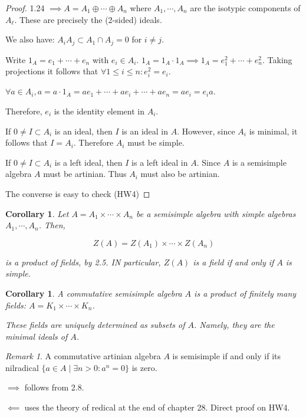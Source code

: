\documentclass{article}
\theoremstyle{definition}
\theoremstyle{plain}
\newtheorem{corollary}[theorem]{Corollary}
\theoremstyle{remark}
\newtheorem{remark}[theorem]{Remark}
\begin{document}
    \begin{proof}
        1.24 \(\implies A = A_1 \oplus \cdots \oplus A_n\) where \(A_1, \cdots , A_n\) are the isotypic components of \(A_\ell\). These are precisely the (2-sided) ideals.

        We also have: \(A_i A_j \subset A_1 \cap A_j = 0\) for \(i\neq j\).

        Write \(1_A = e_1 + \cdots + e_n\) with \(e_i \in A_i\). \(1_A = 1_A \cdot 1_A \implies 1_A = e_1^2 + \cdots + e_n^2\). Taking projections it follows that \(\forall 1 \leq i \leq n: e_i^2 = e_i\).
        
        \(\forall a\in A_i, a = a\cdot 1_A = ae_1 + \cdots + ae_i + \cdots + ae_n = ae_i = e_i a\).
        
        Therefore, \(e_i\) is the identity element in \(A_i\).

        If \(0\neq I \subset A_i\) is an ideal, then \(I\) is an ideal in \(A\). However, since \(A_i\) is minimal, it follows that \(I = A_i\). Therefore \(A_i\) must be simple.

        If \(0 \neq I \subset A_i\) is a left ideal, then \(I\) is a left ideal in \(A\). Since \(A\) is a semisimple algebra \(A\) must be artinian. Thus \(A_i\) must also be artinian.

        The converse is easy to check (HW4)
    \end{proof}

    \begin{corollary}
        Let \(A = A_1 \times \cdots \times A_n\) be a semisimple algebra with simple algebras \(A_1, \cdots , A_n\). Then,
        
        \[
            Z(A) = Z(A_1) \times \cdots \times Z(A_n)
        \]

        is a product of fields, by 2.5. IN particular, \(Z(A)\) is a field if and only if \(A\) is simple.
    \end{corollary}

    \begin{corollary}
        A commutative semisimple algebra \(A\) is a product of finitely many fields: \(A = K_1 \times \cdots \times K_n\).

        These fields are uniquely determined as subsets of \(A\). Namely, they are the minimal ideals of \(A\).
    \end{corollary}

    \begin{remark}
        A commutative artinian algebra \(A\) is semisimple if and only if its nilradical \(\{ a\in A \mid \exists n > 0 : a^n = 0 \} \) is zero.

        \(\implies\) follows from 2.8.

        \(\impliedby\) uses the theory of redical at the end of chapter 28. Direct proof on HW4.
    \end{remark}
\end{document}
